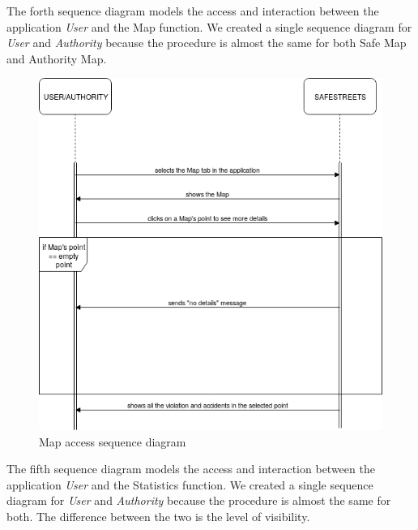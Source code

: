 \documentclass {article}
\begin{document}
		\pagebreak
		The forth sequence diagram models the access and interaction between the application {\it User} and the Map function. We created a single sequence diagram for {\it User} and {\it Authority} because the procedure is almost the same for both Safe Map and Authority Map.
		\begin{figure}[H]
			\centering
			\includegraphics[scale=0.55]{Images/Diagrams/57SeqDiagram.png}
			\caption{Map access sequence diagram}
		\end{figure}
		\pagebreak
		The fifth sequence diagram models the access and interaction between the application {\it User} and the Statistics function. We created a single sequence diagram for  {\it User} and {\it Authority} because the procedure is almost the same for both. The difference between the two is the level of visibility.
\end{document}
